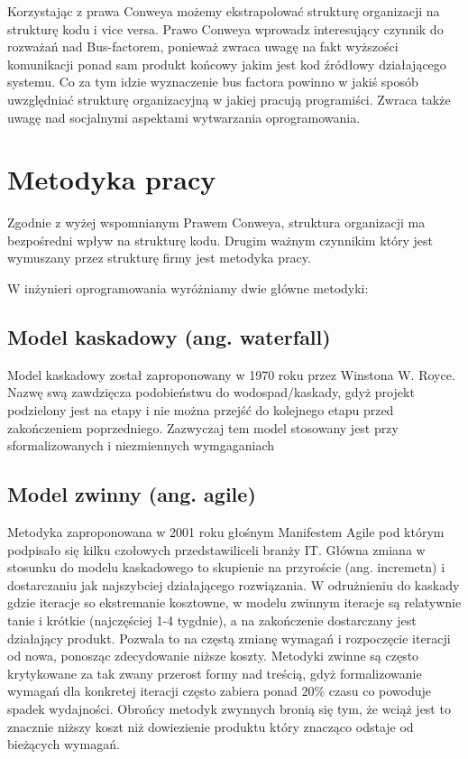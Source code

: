 \documentclass[a4paper,11pt,twoside]{report}
\theoremstyle{definition}
\begin{document}
Korzystając z prawa Conweya możemy ekstrapolować strukturę organizacji na 
strukturę kodu i vice versa. Prawo Conweya wprowadz interesujący czynnik do 
rozważań nad Bus-factorem, ponieważ zwraca uwagę na fakt wyższości 
komunikacji ponad sam produkt końcowy jakim jest kod źródłowy 
działającego systemu. Co za tym idzie wyznaczenie bus factora powinno w 
jakiś sposób uwzględniać strukturę organizacyjną w jakiej pracują 
programiści. Zwraca także uwagę nad socjalnymi aspektami wytwarzania 
oprogramowania.

\section{Metodyka pracy}

Zgodnie z wyżej wspomnianym Prawem Conweya, struktura organizacji ma 
bezpośredni wpływ na strukturę kodu. Drugim ważnym czynnikim który jest 
wymuszany przez strukturę firmy jest metodyka pracy.

W inżynieri oprogramowania wyróżniamy dwie główne metodyki:

\subsection{Model kaskadowy (ang. waterfall)}
Model kaskadowy został zaproponowany w 
1970 roku przez Winstona W. Royce. Nazwę swą zawdzięcza podobieństwu do 
wodospad/kaskady, gdyż projekt podzielony jest na etapy i nie można przejść 
do kolejnego etapu przed zakończeniem poprzedniego. Zazwyczaj tem model 
stosowany jest przy sformalizowanych i niezmiennych wymgaganiach

\subsection{Model zwinny (ang. agile)}
Metodyka zaproponowana w 2001 roku głośnym 
Manifestem Agile pod którym podpisało się kilku czołowych przedstawiliceli 
branży IT. Główna zmiana w stosunku do modelu kaskadowego to skupienie na 
przyroście (ang. incremetn) i dostarczaniu jak najszybciej działającego 
rozwiązania. W odrużnieniu do kaskady gdzie iteracje so ekstremanie 
kosztowne, w modelu zwinnym iteracje są relatywnie tanie i krótkie 
(najczęściej 1-4 tygdnie), a na zakończenie dostarczany jest działający 
produkt. Pozwala to na częstą zmianę wymagań i rozpoczęcie iteracji od 
nowa, ponosząc zdecydowanie niższe koszty. Metodyki zwinne są często 
krytykowane za tak zwany przerost formy nad treścią, gdyż formalizowanie 
wymagań dla konkretej iteracji często zabiera ponad $20\%$ czasu co powoduje 
spadek wydajności. Obrońcy metodyk zwynnych bronią się tym, że wciąż 
jest to znacznie niższy koszt niż dowiezienie produktu który znacząco 
odstaje od bieżących wymagań.
\end{document}
